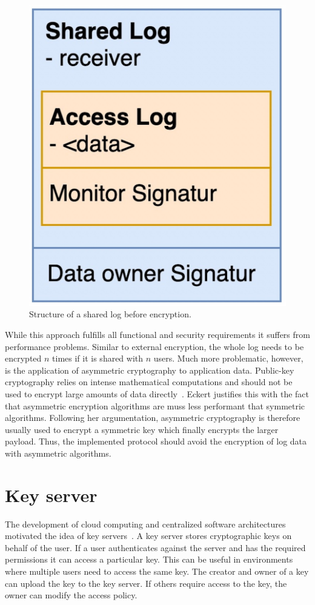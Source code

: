 \documentclass[../main.txt]{subfiles}
\begin{document}
\begin{figure}[t]
\centering
\includegraphics[scale=0.12]{../img/04/mutual_encryption.jpg}
\caption{Structure of a shared log before encryption.}
\label{fig:mutual_encryption}
\end{figure}
While this approach fulfills all functional and security requirements it suffers from performance problems.
Similar to external encryption, the whole log needs to be encrypted $n$ times if it is shared with $n$ users.
Much more problematic, however, is the application of asymmetric cryptography to application data.
Public-key cryptography relies on intense mathematical computations and should not be used to encrypt large amounts of data directly~\cite[340]{Eckert2018}.
Eckert justifies this with the fact that asymmetric encryption algorithms are muss less performant that symmetric algorithms.
Following her argumentation, asymmetric cryptography is therefore usually used to encrypt a symmetric key which finally encrypts the larger payload.
Thus, the implemented protocol should avoid the encryption of log data with asymmetric algorithms.


\section{Key server}
\label{sec:key_server}
The development of cloud computing and centralized software architectures motivated the idea of key servers~\cite{Seitz2003}.
A key server stores cryptographic keys on behalf of the user.
If a user authenticates against the server and has the required permissions it can access a particular key.
This can be useful in environments where multiple users need to access the same key.
The creator and owner of a key can upload the key to the key server.
If others require access to the key, the owner can modify the access policy.
\end{document}
